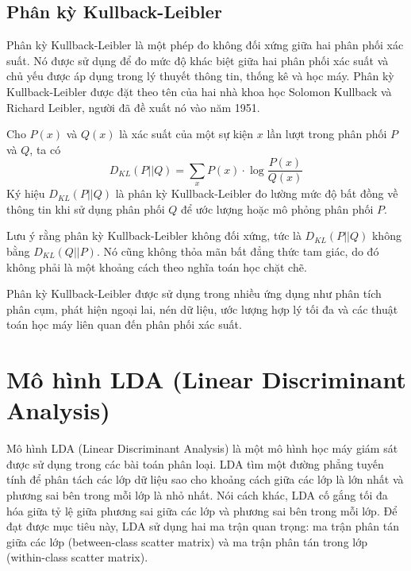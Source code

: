 \subsection{Phân kỳ Kullback-Leibler}
Phân kỳ Kullback-Leibler là một phép đo không đối xứng giữa hai phân phối xác suất. Nó được sử dụng để đo mức độ khác biệt giữa hai phân phối xác suất và chủ yếu được áp dụng trong lý thuyết thông tin, thống kê và học máy. Phân kỳ Kullback-Leibler được đặt theo tên của hai nhà khoa học Solomon Kullback và Richard Leibler, người đã đề xuất nó vào năm 1951.
\begin{definition}
	Cho $P(x)$ và $Q(x)$ là xác suất của một sự kiện $x$ lần lượt trong phân phối $P$ và $Q$, ta có
	\begin{equation*}
		D_{KL}\left(P || Q\right) = \sum\limits_{x} P(x) \cdot \log\frac{P(x)}{Q(x)}
	\end{equation*}
	Ký hiệu $D_{KL}\left(P || Q\right)$ là phân kỳ Kullback-Leibler đo lường mức độ bất đồng về thông tin khi sử dụng phân phối $Q$ để ước lượng hoặc mô phỏng phân phối $P$.
	
	Lưu ý rằng phân kỳ Kullback-Leibler không đối xứng, tức là $D_{KL}\left(P || Q\right)$ không bằng $D_{KL}\left(Q || P\right)$. Nó cũng không thỏa mãn bất đẳng thức tam giác, do đó không phải là một khoảng cách theo nghĩa toán học chặt chẽ.
	
	Phân kỳ Kullback-Leibler được sử dụng trong nhiều ứng dụng như phân tích phân cụm, phát hiện ngoại lai, nén dữ liệu, ước lượng hợp lý tối đa và các thuật toán học máy liên quan đến phân phối xác suất.
\end{definition}

\section{Mô hình LDA (Linear Discriminant Analysis)}
Mô hình LDA (Linear Discriminant Analysis) là một mô hình học máy giám sát được sử dụng trong các bài toán phân loại. LDA tìm một đường phẳng tuyến tính để phân tách các lớp dữ liệu sao cho khoảng cách giữa các lớp là lớn nhất và phương sai bên trong mỗi lớp là nhỏ nhất. Nói cách khác, LDA cố gắng tối đa hóa giữa tỷ lệ giữa phương sai giữa các lớp và phương sai bên trong mỗi lớp. Để đạt được mục tiêu này, LDA sử dụng hai ma trận quan trọng: ma trận phân tán giữa các lớp (between-class scatter matrix) và ma trận phân tán trong lớp (within-class scatter matrix).

